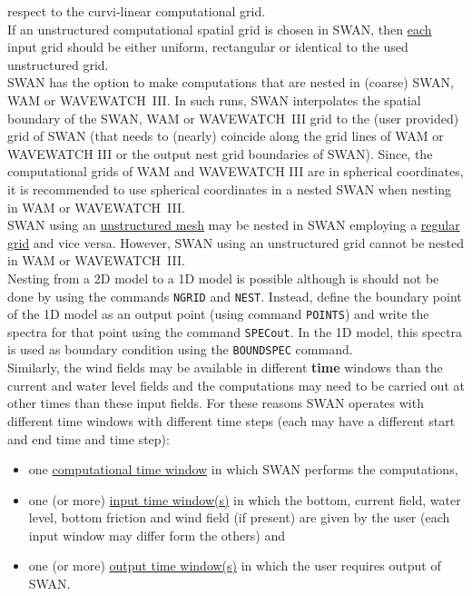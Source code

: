 \documentclass[12pt]{book}
\begin{document}
respect to the curvi-linear computational grid.
\\[2ex]
\noindent
If an unstructured computational spatial grid is chosen in SWAN, then \underline{each} input grid
should be either uniform, rectangular or identical to the used unstructured grid.
\\[2ex]
\noindent
SWAN has the option to make computations that are nested in (coarse) SWAN, WAM or WAVEWATCH~III.
In such runs, SWAN interpolates the spatial boundary of the SWAN, WAM or WAVEWATCH~III grid to the
(user provided) grid of SWAN (that needs to (nearly) coincide along the grid lines of WAM or WAVEWATCH
III or the output nest grid boundaries of SWAN). Since, the computational grids of WAM and WAVEWATCH
III are in spherical coordinates, it is recommended to use spherical coordinates in a nested SWAN when
nesting in WAM or WAVEWATCH~III.
\\[2ex]
\noindent
SWAN using an \underline{unstructured mesh} may be nested in SWAN employing a \underline{regular grid} and
vice versa. However, SWAN using an unstructured grid cannot be nested in WAM or WAVEWATCH~III.
\\[2ex]
\noindent
Nesting from a 2D model to a 1D model is possible although is should not be done by using the
commands {\tt NGRID} and {\tt NEST}. Instead, define the boundary point of the 1D model as an output
point (using command {\tt POINTS}) and write the spectra for that point using the command {\tt SPECout}.
In the 1D model, this spectra is used as boundary condition using the {\tt BOUNDSPEC} command.
\\[2ex]
\noindent
Similarly, the wind fields may be available in different {\bf time} windows than the current and water
level fields and the computations may need to be carried out at other times than these input fields.
For these reasons SWAN operates with different time windows with different time steps (each may have
a different start and end time and time step):
\begin{itemize}
  \item one \underline{computational time window} in which SWAN performs the computations,
  \item one (or more) \underline{input time window(s)} in which the bottom, current field, water level,
        bottom friction and wind field (if present) are given by the user (each input window may differ
        form the others) and
  \item one (or more) \underline{output time window(s)} in which the user requires output of SWAN.
\end{itemize}
\end{document}
